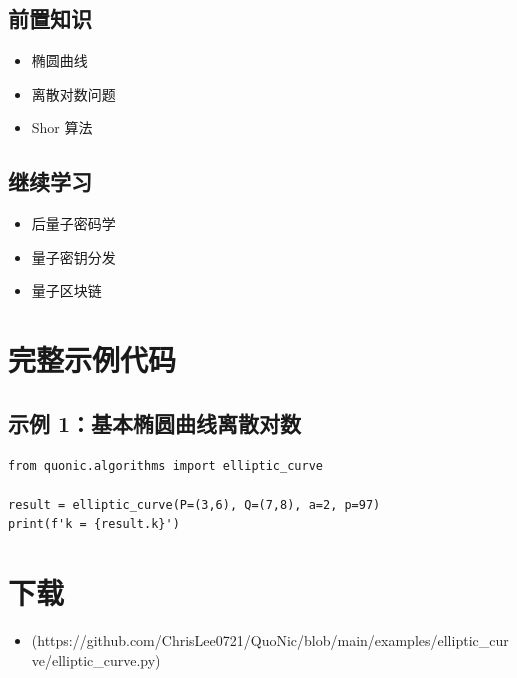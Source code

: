 \documentclass[12pt,a4paper]{article}
\begin{document}
\subsection{前置知识}
\begin{itemize}
  \item 椭圆曲线
  \item 离散对数问题
  \item Shor 算法
\end{itemize}

\subsection{继续学习}
\begin{itemize}
  \item 后量子密码学
  \item 量子密钥分发
  \item 量子区块链
\end{itemize}

\section{完整示例代码}

\subsection{示例 1：基本椭圆曲线离散对数}

\begin{verbatim}
from quonic.algorithms import elliptic_curve

result = elliptic_curve(P=(3,6), Q=(7,8), a=2, p=97)
print(f'k = {result.k}')
\end{verbatim}

\section{下载}

\begin{itemize}
  \item [elliptic\_curve.py](https://github.com/ChrisLee0721/QuoNic/blob/main/examples/elliptic_curve/elliptic_curve.py)
\end{itemize}
\end{document}
